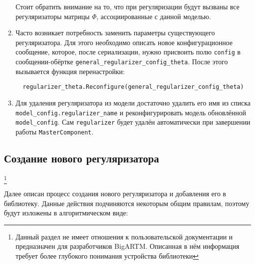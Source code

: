 \begin{enumerate}
	Стоит обратить внимание на то, что при регуляризации будут вызваны все регуляризаторы матрицы $\Phi$, ассоциированные с данной моделью.
	
	\item Часто возникает потребность заменить параметры существующего регуляризатора. Для этого необходимо описать новое конфигурационное сообщение, которое, после сериализации, нужно присвоить полю \verb|config| в сообщении-обёртке \verb|general_regularizer_config_theta|. После этого вызывается функция перенастройки:
	
	\vspace{4pt}	
	\verb|  regularizer_theta.Reconfigure(general_regularizer_config_theta)|
	\vspace{4pt}	
	
	\item Для удаления регуляризатора из модели достаточно удалить его имя из списка \verb|model_config.regularizer_name| и реконфигурировать модель обновлённой \verb|model_config|. Сам \verb|regularizer| будет удалён автоматически при завершении работы \verb|MasterComponent|.
	
\end{enumerate}

\subsection{Создание нового регуляризатора}
\footnote{Данный раздел не имеет отношения к пользовательской документации и предназначен для разработчиков BigARTM. Описанная в нём информация требует более глубокого понимания устройства библиотеки}

Далее описан процесс создания нового регуляризатора и добавления его в библиотеку. Данные действия подчиняются некоторым общим правилам, поэтому будут изложены в алгоритмическом виде:

